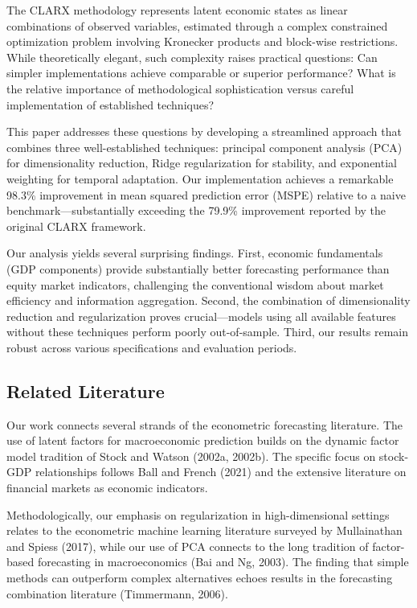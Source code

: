 \documentclass[11pt,letterpaper]{article}
\theoremstyle{plain}
\theoremstyle{definition}
\theoremstyle{remark}
\begin{document}
The CLARX methodology represents latent economic states as linear combinations of observed variables, estimated through a complex constrained optimization problem involving Kronecker products and block-wise restrictions. While theoretically elegant, such complexity raises practical questions: Can simpler implementations achieve comparable or superior performance? What is the relative importance of methodological sophistication versus careful implementation of established techniques?

This paper addresses these questions by developing a streamlined approach that combines three well-established techniques: principal component analysis (PCA) for dimensionality reduction, Ridge regularization for stability, and exponential weighting for temporal adaptation. Our implementation achieves a remarkable 98.3\% improvement in mean squared prediction error (MSPE) relative to a naive benchmark—substantially exceeding the 79.9\% improvement reported by the original CLARX framework.

Our analysis yields several surprising findings. First, economic fundamentals (GDP components) provide substantially better forecasting performance than equity market indicators, challenging the conventional wisdom about market efficiency and information aggregation. Second, the combination of dimensionality reduction and regularization proves crucial—models using all available features without these techniques perform poorly out-of-sample. Third, our results remain robust across various specifications and evaluation periods.

\subsection{Related Literature}

Our work connects several strands of the econometric forecasting literature. The use of latent factors for macroeconomic prediction builds on the dynamic factor model tradition of Stock and Watson (2002a, 2002b). The specific focus on stock-GDP relationships follows Ball and French (2021) and the extensive literature on financial markets as economic indicators.

Methodologically, our emphasis on regularization in high-dimensional settings relates to the econometric machine learning literature surveyed by Mullainathan and Spiess (2017), while our use of PCA connects to the long tradition of factor-based forecasting in macroeconomics (Bai and Ng, 2003). The finding that simple methods can outperform complex alternatives echoes results in the forecasting combination literature (Timmermann, 2006).
\end{document}
